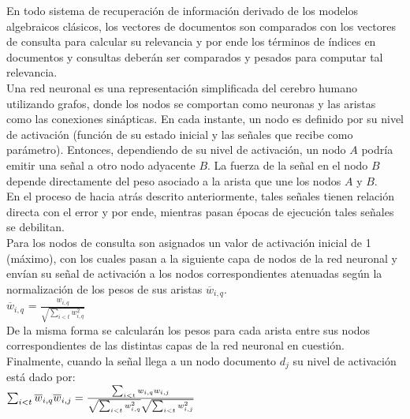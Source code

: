 \documentclass{llncs}
\begin{document}
\begin{multicols}{2}[]
En todo sistema de recuperaci\'on de informaci\'on derivado de los modelos algebraicos cl\'asicos, los vectores de documentos son comparados con los vectores de consulta
para calcular su relevancia y por ende los t\'erminos de \'indices en documentos y consultas deber\'an ser comparados y pesados para computar tal relevancia. \\


Una red neuronal es una representaci\'on simplificada del cerebro humano utilizando grafos, donde los nodos se comportan como neuronas y las aristas como las
conexiones sin\'apticas. En cada instante, un nodo es definido por su nivel de activaci\'on (funci\'on de su estado inicial y las se\~nales que recibe como par\'ametro).
Entonces, dependiendo de su nivel de activaci\'on, un nodo $A$ podr\'ia emitir una se\~nal a otro nodo adyacente $B$. La fuerza de la se\~nal en el nodo $B$
depende directamente del peso asociado a la arista que une los nodos $A$ y $B$.\\

En el proceso de hacia atr\'as descrito anteriormente, tales se\~nales tienen relaci\'on directa con el error y por ende, mientras pasan \'epocas de ejecuci\'on tales
se\~nales se debilitan.\\

Para los nodos de consulta son asignados un valor de activaci\'on inicial de 1 (m\'aximo), con los cuales pasan a la siguiente capa de nodos de la red neuronal y env\'ian
su se\~nal de activaci\'on a los nodos correspondientes atenuadas seg\'un la normalizaci\'on de los pesos de sus aristas $\overline{w}_{i,q}$.\\

$\overline{w}_{i, q}$ = $\frac{w_{i, q}}{\sqrt{\sum_{i < t}{w^2_{i, q}}}}$ \\

De la misma forma se calcular\'an los pesos para cada arista entre sus nodos correspondien\-tes de las distintas capas de la red neuronal en cuesti\'on. Finalmente,
cuando la se\~nal llega a un nodo documento $d_j$ su nivel de activaci\'on est\'a dado por: \\

$\sum_{i < t}{\overline{w}_{i, q}\overline{w}_{i, j}} = \frac{\sum_{i < t}{w_{i,q}w_{i,j}}}{\sqrt{\sum_{i < t}{w^2_{i, q}}} \* \sqrt{\sum_{i < t}{w^2_{i, j}}}}$ \\


\end{multicols}
\end{document}
